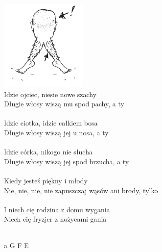 \documentclass[a5paper, 10pt]{book}
\begin{document}
\begin{minipage}[t]{0.9\textwidth}
\includegraphics[height=4.5cm, right]{wlosy2.png}\vspace*{-4.6cm}\\
Idzie ojciec, niesie nowe szachy\\
Długie włosy wiszą mu spod pachy, a ty\\
\\
Idzie ciotka, idzie całkiem bosa\\
Długie włosy wiszą jej u nosa, a ty\\
\\
Idzie córka, nikogo nie słucha\\
Długie włosy wiszą jej spod brzucha, a ty\\
\\
Kiedy jesteś piękny i młody\\
Nie, nie, nie, nie zapuszczaj wąsów ani brody, tylko\\
\\
I niech cię rodzina z domu wygania\\
Niech cię fryzjer z nożycami gania\\
\\
\end{minipage}
\begin{minipage}[t]{0.1\textwidth}
a G F E\\
\end{minipage}
\newpage
\end{document}
